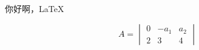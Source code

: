 \documentclass{article}
\begin{document}
	你好啊，\LaTeX

\begin{equation}
	\label{eq:1}
		A\hat{} = 	\begin{vmatrix}
			0 & -a_1 & a_2 \\
			2 & 3 &4
		\end{vmatrix}

\end{equation}
\end{document}
